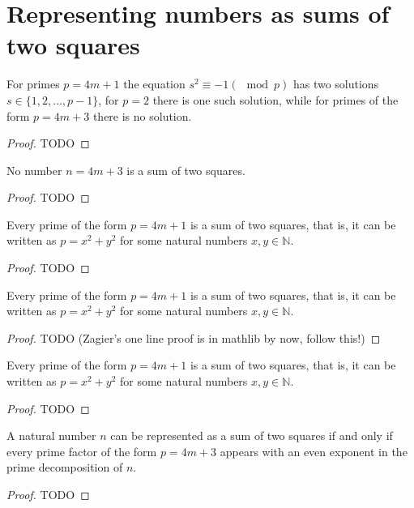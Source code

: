 \chapter{Representing numbers as sums of two squares}

\begin{lemma}[Lemma 1]
  \label{ch3.lemma1}
  For primes \(p = 4m + 1\) the equation \(s^2 \equiv -1 (\mod p)\) has two
  solutions \(s \in \{1, 2, \dots, p - 1\}\), for \(p = 2\) there is one such solution, while
  for primes of the form \(p = 4m + 3\) there is no solution.
\end{lemma}
\begin{proof}
  TODO
\end{proof}


\begin{lemma}[Lemma 2]
  \label{ch3.lemma2}
  No number \(n = 4m + 3\) is a sum of two squares.
\end{lemma}
\begin{proof}
  TODO
\end{proof}

\begin{proposition}
  \label{ch3.proposition1}
  Every prime of the form \(p = 4m + 1\) is a sum of two squares,
  that is, it can be written as \(p = x^2 + y^2\) for some natural numbers \(x,y \in \mathbb{N}\).
\end{proposition}
\begin{proof}
  TODO
\end{proof}

\begin{proposition}
  \label{ch3.proposition2}
  Every prime of the form \(p = 4m + 1\) is a sum of two squares,
  that is, it can be written as \(p = x^2 + y^2\) for some natural numbers \(x,y \in \mathbb{N}\).
\end{proposition}
\begin{proof}
  TODO (Zagier's one line proof is in mathlib by now, follow this!)
\end{proof}

\begin{proposition}
  \label{ch3.proposition3}
  Every prime of the form \(p = 4m + 1\) is a sum of two squares,
  that is, it can be written as \(p = x^2 + y^2\) for some natural numbers \(x,y \in \mathbb{N}\).
\end{proposition}
\begin{proof}
  TODO
\end{proof}

\begin{theorem}
  \label{sum_of_two_squares}
  A natural number \(n\) can be represented as a sum of two squares
  if and only if every prime factor of the form \(p = 4m + 3\) appears with an
  even exponent in the prime decomposition of \(n\).
\end{theorem}
\begin{proof}
  TODO
\end{proof}
